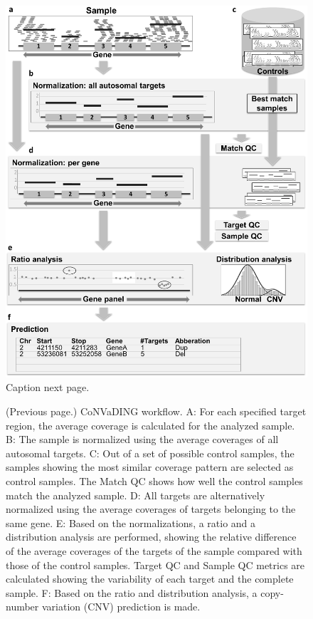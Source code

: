 \begin{figure}
	\includegraphics[width=1.0\linewidth]{img/CoNVaDING_Fig1}
	\caption[CoNVaDING workflow]{Caption next page.}
	\label{fig:CoNVaDING_Fig1}
\end{figure}
\addtocounter{figure}{-1}
\begin{figure}
\caption[]{(Previous page.) CoNVaDING workflow. A: For each specified target region, the average coverage is calculated for the analyzed sample. B: The sample is normalized using the average coverages of all autosomal targets. C: Out of a set of possible control samples, the samples showing the most similar coverage pattern are selected as control samples. The Match QC shows how well the control samples match the analyzed sample. D: All targets are alternatively normalized using the average coverages of targets belonging to the same gene. E: Based on the normalizations, a ratio and a distribution analysis are performed, showing the relative difference of the average coverages of the targets of the sample compared with those of the control samples. Target QC and Sample QC metrics are calculated showing the variability of each target and the complete sample. F: Based on the ratio and distribution analysis, a copy-number variation (CNV) prediction is made.}
\end{figure}

